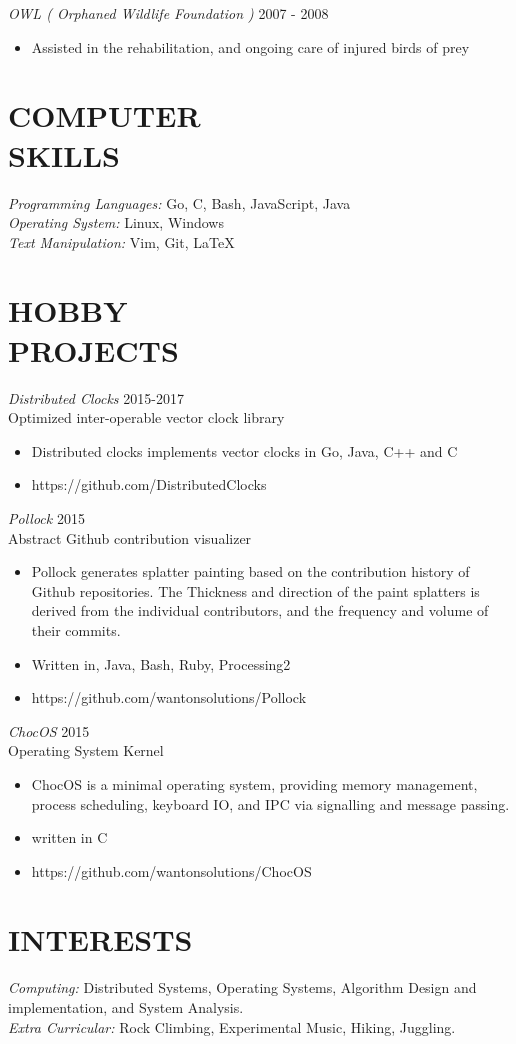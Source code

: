 \documentclass[line,margin]{res}
\begin{document}
\begin{resume}
{{\sl OWL ( Orphaned Wildlife Foundation )} {\hfill 2007 - 2008}
    \begin{itemize}
         \item Assisted in the rehabilitation, and ongoing care of injured birds of prey
    \end{itemize}
}
    

\section{COMPUTER \\ SKILLS} 
	{\sl Programming Languages:} Go, C, Bash, JavaScript, Java\\
	{\sl Operating System:} Linux, Windows\\
	{\sl Text Manipulation:} Vim, Git, \LaTeX \\

\section{HOBBY \\ PROJECTS}
{\sl Distributed Clocks} \hfill 2015-2017\\
    Optimized inter-operable vector clock library
\begin{itemize} \itemsep -2pt
		\item Distributed clocks implements vector clocks in Go, Java, C++ and C
		\item https://github.com/DistributedClocks
\end{itemize}

{\sl Pollock} \hfill 2015\\
	Abstract Github contribution visualizer
\begin{itemize} \itemsep -2pt
		\item Pollock generates splatter painting based on the contribution history of Github repositories. The Thickness and direction of the paint splatters is derived from the individual contributors, and the frequency and volume of their commits.
		\item Written in, Java, Bash, Ruby, Processing2
		\item https://github.com/wantonsolutions/Pollock
\end{itemize}

{\sl ChocOS} \hfill 2015\\
	Operating System Kernel
\begin{itemize} \itemsep -2pt
		\item ChocOS is a minimal operating system, providing memory management, process scheduling, keyboard IO, and IPC via signalling and message passing.
		\item written in C
		\item https://github.com/wantonsolutions/ChocOS
\end{itemize}

\section{INTERESTS}
	{\sl Computing:}  Distributed Systems, Operating Systems, Algorithm Design and implementation, and System Analysis.\\
	{\sl Extra Curricular:} Rock Climbing, Experimental Music, Hiking, Juggling.\\

\end{resume}
\end{document}
